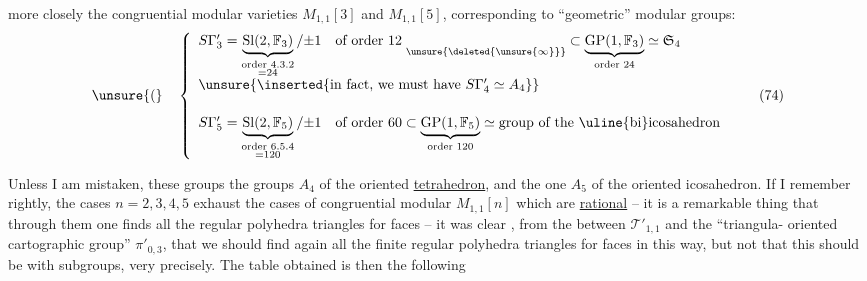 
more closely the congruential modular varieties
$M_{1,1}[3]$ and $M_{1,1}[5]$, corresponding to
``geometric'' modular groups:
\[
\unsure{(}\quad
\left\{
\begin{array}{l}
S\Gamma'_3 = \underbrace{\mathrm{Sl}(2,\mathbb F_3)}_{\substack{\text{order }4.3.2\\=24}}/\mathord{\pm}1
\quad \text{of order }12\;\underset{\unsure{\deleted{\unsure{\infty}}}}{\phantom{a}}
\subset \underbrace{\mathrm{GP}(1,\mathbb F_3)}_{\text{order }24}\simeq\mathfrak S_4
\\[1.5em]
\unsure{\inserted{\text{in fact, we must have } S\Gamma'_4\simeq A_4}}
\\[1.5em]
S\Gamma'_5 = \underbrace{\mathrm{Sl}(2,\mathbb F_5)}_{\substack{\text{order }6.5.4\\=120}}/\mathord{\pm}1
\quad \text{of order }60
\subset \underbrace{\mathrm{GP}(1,\mathbb F_5)}_{\text{order }120}\simeq\text{group of the \uline{bi}icosahedron}
\end{array}
\right.
\tag{74}
\]

Unless I am mistaken, these groups   the groups $A_4$ of the
oriented \uline{tetrahedron}, and the one $A_5$ of the oriented icosahedron.
If I remember rightly, the cases
$n=2,3,4,5$ exhaust the cases of congruential modular 
$M_{1,1}[n]$ which are \uline{rational}
-- it is a remarkable thing that through them one finds
all the regular  polyhedra  triangles for faces
-- it was clear , from the  between
$\mathcal T'_{1,1}$ and the ``triangula- oriented cartographic group'' $\pi'_{0,3}$,
that we should find again all
the finite regular polyhedra  triangles for faces
in this way, but not that
this should be with  subgroups,
very precisely. The table obtained is
then the following



